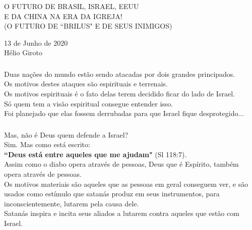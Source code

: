 \documentclass[aspectratio=169]{beamer}
\author{Hélio Giroto}
\begin{document}

\begin{frame}
  \frametitle{}
  \framesubtitle{}
  \centering
  {\huge O FUTURO DE BRASIL, ISRAEL, EEUU}\\
  {\huge E DA CHINA NA ERA DA IGREJA!}\\
  	\vspace{.5cm}
  {\large (O FUTURO DE ``BRILUS" E DE SEUS INIMIGOS)}
  	\vspace{1cm}
  	
	{\normalsize 13 de Junho de 2020}\\
	{\scriptsize  Hélio Giroto}
\end{frame}


\begin{frame}
  \frametitle{}
  \framesubtitle{}
  \large
    \centering
	Duas nações do mundo estão sendo atacadas por dois grandes principados. \\
	Os motivos destes ataques são espirituais e terrenais. \\
	\vspace{.5cm}
	Os motivos espirituais é o fato delas terem decidido ficar do lado de Israel. \\
	Só quem tem a visão espiritual consegue entender isso.\\
	Foi planejado que elas fossem derrubadas para que Israel fique desprotegido... \\
\end{frame}



\begin{frame}
  \frametitle{}
  \framesubtitle{}
    \centering
    \large
  Mas, não é Deus quem defende a Israel?\\
	Sim. Mas como está escrito: \\
	\textbf{``Deus está entre aqueles que me ajudam"} (Sl 118:7). \\
	\vspace{.5cm}
	Assim como o diabo opera através de pessoas, Deus que é Espírito, também opera através de pessoas. \\
	Os motivos materiais são aqueles que as pessoas em geral conseguem ver, e são usados como estímulo que satanás produz em seus instrumentos, para inconscientemente, lutarem pela causa dele. \\
	Satanás inspira e incita seus aliados a lutarem contra aqueles que estão com Israel. 
\end{frame}
\end{document}

